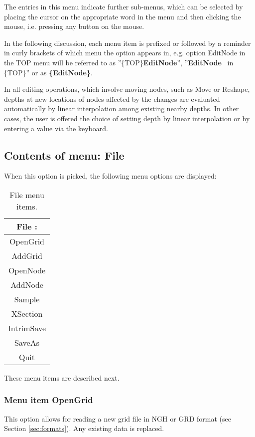 \documentclass{article}
\begin{document}
The entries in this menu indicate further sub-menus, which can be selected by placing the cursor on the appropriate word in the menu and then clicking the mouse, i.e. pressing any button on the mouse.

In the following discussion, each menu item is prefixed or followed by a reminder in curly brackets of which menu the option appears in, e.g. option EditNode in the TOP menu will be referred to as ''\{TOP\}\textbf{EditNode{}}'', ''\textbf{EditNode} \ in \{TOP\}'' or as \textbf{\{EditNode\}}.

In all editing operations, which involve moving nodes, such as Move or Reshape, depths at new locations of nodes affected by the changes are evaluated automatically by linear interpolation among existing nearby depths. In other cases, the user is offered the choice of setting depth by linear interpolation or by entering a value via the keyboard.

\subsection{Contents of menu: File}
When this option is picked, the following menu options are displayed:

\begin{table}[htb!]
 \caption{File menu items.}
  \begin{center}
   \begin{tabular}{|c|}
    \hline
File :\\     \hline
OpenGrid \\ AddGrid \\     \hline
OpenNode \\ AddNode \\    \hline
Sample \\    \hline
XSection \\    \hline
IntrimSave \\ SaveAs \\    \hline
 Quit\\
    \hline
   \end{tabular}
   \label{tab:FILE}
  \end{center}
\end{table}

These menu items are described next.

\subsubsection[Menu item OpenGrid]{Menu item OpenGrid}
This option allows for reading a new grid file in NGH or GRD format (see Section \ref{sec:formats}). Any existing data is replaced.
\end{document}
